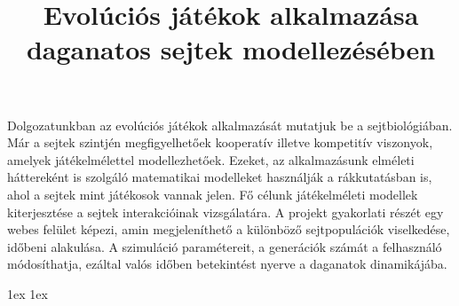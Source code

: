 \documentclass[12pt,a4paper]{ubb_dolgozat}
\title{Evolúciós játékok alkalmazása daganatos sejtek modellezésében}
\begin{document}

	Dolgozatunkban az evolúciós játékok alkalmazását mutatjuk be a sejtbiológiában. Már a sejtek szintjén megfigyelhetőek kooperatív illetve kompetitív viszonyok, amelyek játékelmélettel modellezhetőek. Ezeket, az alkalmazásunk elméleti háttereként is szolgáló matematikai modelleket használják a rákkutatásban is, ahol a sejtek mint játékosok vannak jelen. Fő célunk játékelméleti modellek kiterjesztése a sejtek interakcióinak vizsgálatára. A projekt gyakorlati részét egy webes felület képezi, amin megjeleníthető a különböző sejtpopulációk viselkedése, időbeni alakulása. A szimuláció paramétereit, a generációk számát a felhasználó módosíthatja, ezáltal valós időben betekintést nyerve a daganatok dinamikájába.

{ 
	\newpage
	\baselineskip 1ex
	\parskip 1ex
	\tableofcontents
}











\end{document}
